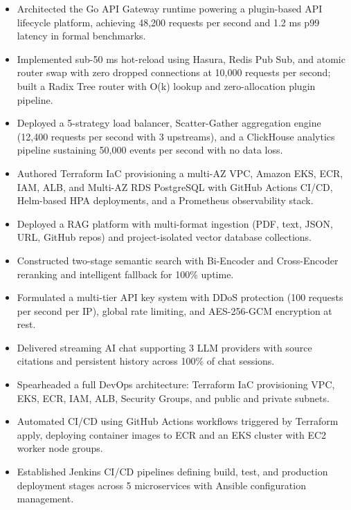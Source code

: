 \documentclass{resume}
\begin{document}
\begin{itemize}
  \item Architected the Go API Gateway runtime powering a plugin-based API lifecycle platform, achieving 48,200 requests per second and 1.2 ms p99 latency in formal benchmarks.
  \item Implemented sub-50 ms hot-reload using Hasura, Redis Pub Sub, and atomic router swap with zero dropped connections at 10,000 requests per second; built a Radix Tree router with O(k) lookup and zero-allocation plugin pipeline.
  \item Deployed a 5-strategy load balancer, Scatter-Gather aggregation engine (12,400 requests per second with 3 upstreams), and a ClickHouse analytics pipeline sustaining 50,000 events per second with no data loss.
  \item Authored Terraform IaC provisioning a multi-AZ VPC, Amazon EKS, ECR, IAM, ALB, and Multi-AZ RDS PostgreSQL with GitHub Actions CI/CD, Helm-based HPA deployments, and a Prometheus observability stack.
\end{itemize}

\begin{itemize}
  \item Deployed a RAG platform with multi-format ingestion (PDF, text, JSON, URL, GitHub repos) and project-isolated vector database collections.
  \item Constructed two-stage semantic search with Bi-Encoder and Cross-Encoder reranking and intelligent fallback for 100\% uptime.
  \item Formulated a multi-tier API key system with DDoS protection (100 requests per second per IP), global rate limiting, and AES-256-GCM encryption at rest.
  \item Delivered streaming AI chat supporting 3 LLM providers with source citations and persistent history across 100\% of chat sessions.
\end{itemize}

\begin{itemize}
  \item Spearheaded a full DevOps architecture: Terraform IaC provisioning VPC, EKS, ECR, IAM, ALB, Security Groups, and public and private subnets.
  \item Automated CI/CD using GitHub Actions workflows triggered by Terraform apply, deploying container images to ECR and an EKS cluster with EC2 worker node groups.
  \item Established Jenkins CI/CD pipelines defining build, test, and production deployment stages across 5 microservices with Ansible configuration management.
\end{itemize}
\end{document}
